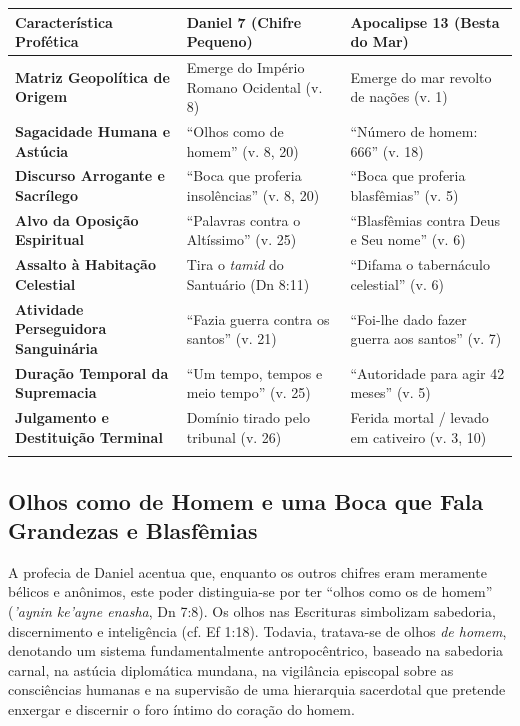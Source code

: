 \begin{table}[htbp]
\centering
\footnotesize
\setlength{\tabcolsep}{5pt}
\renewcommand{\arraystretch}{1.25}
\begin{tabularx}{\textwidth}{>{\raggedright\arraybackslash}p{} >{\raggedright\arraybackslash}X >{\raggedright\arraybackslash}X}
\toprule
\textbf{Característica Profética} & \textbf{Daniel 7 (Chifre Pequeno)} & \textbf{Apocalipse 13 (Besta do Mar)} \\
\midrule
\textbf{Matriz Geopolítica de Origem} & Emerge do Império Romano Ocidental (v. 8) & Emerge do mar revolto de nações (v. 1) \\
\addlinespace[3pt]
\textbf{Sagacidade Humana e Astúcia} & ``Olhos como de homem'' (v. 8, 20) & ``Número de homem: 666'' (v. 18) \\
\addlinespace[3pt]
\textbf{Discurso Arrogante e Sacrílego} & ``Boca que proferia insolências'' (v. 8, 20) & ``Boca que proferia blasfêmias'' (v. 5) \\
\addlinespace[3pt]
\textbf{Alvo da Oposição Espiritual} & ``Palavras contra o Altíssimo'' (v. 25) & ``Blasfêmias contra Deus e Seu nome'' (v. 6) \\
\addlinespace[3pt]
\textbf{Assalto à Habitação Celestial} & Tira o \textit{tamid} do Santuário (Dn 8:11) & ``Difama o tabernáculo celestial'' (v. 6) \\
\addlinespace[3pt]
\textbf{Atividade Perseguidora Sanguinária} & ``Fazia guerra contra os santos'' (v. 21) & ``Foi-lhe dado fazer guerra aos santos'' (v. 7) \\
\addlinespace[3pt]
\textbf{Duração Temporal da Supremacia} & ``Um tempo, tempos e meio tempo'' (v. 25) & ``Autoridade para agir 42 meses'' (v. 5) \\
\addlinespace[3pt]
\textbf{Julgamento e Destituição Terminal} & Domínio tirado pelo tribunal (v. 26) & Ferida mortal / levado em cativeiro (v. 3, 10) \\
\addlinespace[3pt]
\bottomrule
\end{tabularx}
\end{table}




\subsection{Olhos como de Homem e uma Boca que Fala Grandezas e Blasfêmias}


A profecia de Daniel acentua que, enquanto os outros chifres eram meramente bélicos e anônimos, este poder distinguia-se por ter ``olhos como os de homem'' (\textit{'aynin ke'ayne enasha}, Dn 7:8). Os olhos nas Escrituras simbolizam sabedoria, discernimento e inteligência (cf. Ef 1:18). Todavia, tratava-se de olhos \textit{de homem}, denotando um sistema fundamentalmente antropocêntrico, baseado na sabedoria carnal, na astúcia diplomática mundana, na vigilância episcopal sobre as consciências humanas e na supervisão de uma hierarquia sacerdotal que pretende enxergar e discernir o foro íntimo do coração do homem.


